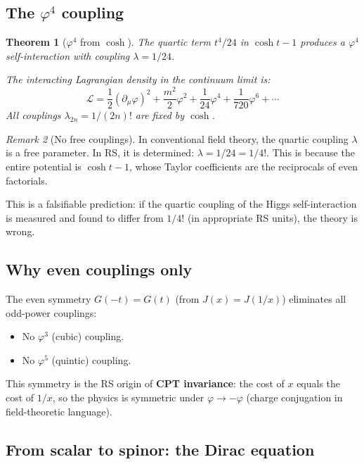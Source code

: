 \documentclass[11pt,a4paper]{article}
\theoremstyle{plain}
\newtheorem{theorem}{Theorem}[section]
\theoremstyle{definition}
\theoremstyle{remark}
\newtheorem{remark}[theorem]{Remark}
\newcommand{\Jcost}{J}
\newcommand{\Jlog}{G}
\begin{document}
\subsection{The $\varphi^4$ coupling}

\begin{theorem}[$\varphi^4$ from $\cosh$]
\label{thm:phi4}
The quartic term $t^4/24$ in $\cosh t - 1$ produces a $\varphi^4$
self-interaction with coupling $\lambda = 1/24$.

The interacting Lagrangian density in the continuum limit is:
\[
  \mathcal{L} = \frac{1}{2}(\partial_\mu\varphi)^2 + \frac{m^2}{2}\varphi^2
  + \frac{1}{24}\varphi^4 + \frac{1}{720}\varphi^6 + \cdots
\]
All couplings $\lambda_{2n} = 1/(2n)!$ are fixed by $\cosh$.
\end{theorem}

\begin{remark}[No free couplings]
In conventional field theory, the quartic coupling $\lambda$ is a free
parameter.  In RS, it is determined: $\lambda = 1/24 = 1/4!$.  This is
because the entire potential is $\cosh t - 1$, whose Taylor coefficients
are the reciprocals of even factorials.

This is a falsifiable prediction: if the quartic coupling of the Higgs
self-interaction is measured and found to differ from $1/4!$ (in
appropriate RS units), the theory is wrong.
\end{remark}

\subsection{Why even couplings only}

The even symmetry $\Jlog(-t) = \Jlog(t)$ (from $\Jcost(x) = \Jcost(1/x)$)
eliminates all odd-power couplings:
\begin{itemize}[nosep]
\item No $\varphi^3$ (cubic) coupling.
\item No $\varphi^5$ (quintic) coupling.
\end{itemize}

This symmetry is the RS origin of \textbf{CPT invariance}: the cost of
$x$ equals the cost of $1/x$, so the physics is symmetric under
$\varphi \to -\varphi$ (charge conjugation in field-theoretic language).

\subsection{From scalar to spinor: the Dirac equation}
\end{document}

